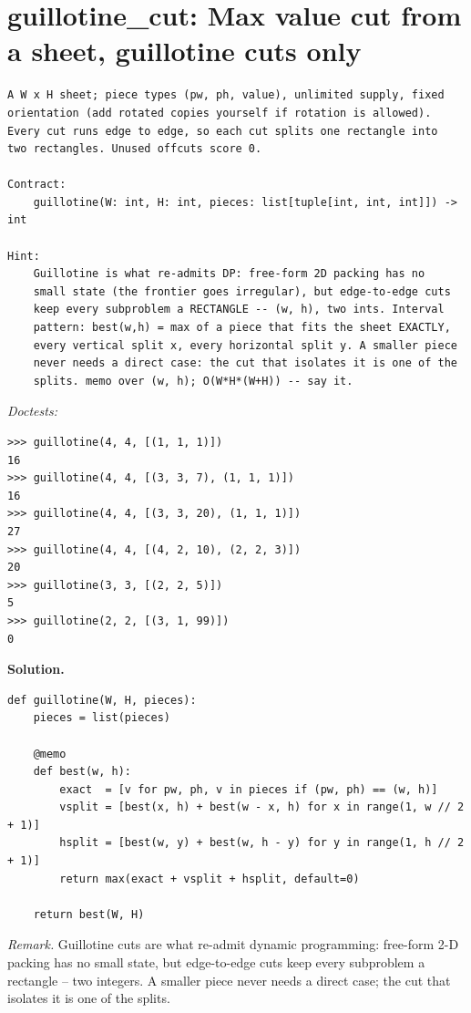 \documentclass[11pt,letterpaper]{book}
\begin{document}
\section{guillotine\_cut: Max value cut from a sheet, guillotine cuts only}
\begin{lstlisting}[style=spec]
A W x H sheet; piece types (pw, ph, value), unlimited supply, fixed
orientation (add rotated copies yourself if rotation is allowed).
Every cut runs edge to edge, so each cut splits one rectangle into
two rectangles. Unused offcuts score 0.

Contract:
    guillotine(W: int, H: int, pieces: list[tuple[int, int, int]]) -> int

Hint:
    Guillotine is what re-admits DP: free-form 2D packing has no
    small state (the frontier goes irregular), but edge-to-edge cuts
    keep every subproblem a RECTANGLE -- (w, h), two ints. Interval
    pattern: best(w,h) = max of a piece that fits the sheet EXACTLY,
    every vertical split x, every horizontal split y. A smaller piece
    never needs a direct case: the cut that isolates it is one of the
    splits. memo over (w, h); O(W*H*(W+H)) -- say it.
\end{lstlisting}
\noindent\textit{Doctests:}
\begin{lstlisting}[style=spec]
>>> guillotine(4, 4, [(1, 1, 1)])
16
>>> guillotine(4, 4, [(3, 3, 7), (1, 1, 1)])
16
>>> guillotine(4, 4, [(3, 3, 20), (1, 1, 1)])
27
>>> guillotine(4, 4, [(4, 2, 10), (2, 2, 3)])
20
>>> guillotine(3, 3, [(2, 2, 5)])
5
>>> guillotine(2, 2, [(3, 1, 99)])
0
\end{lstlisting}
\noindent\textbf{Solution.}
\begin{lstlisting}[style=code]
def guillotine(W, H, pieces):
    pieces = list(pieces)

    @memo
    def best(w, h):
        exact  = [v for pw, ph, v in pieces if (pw, ph) == (w, h)]
        vsplit = [best(x, h) + best(w - x, h) for x in range(1, w // 2 + 1)]
        hsplit = [best(w, y) + best(w, h - y) for y in range(1, h // 2 + 1)]
        return max(exact + vsplit + hsplit, default=0)

    return best(W, H)
\end{lstlisting}

\noindent\textit{Remark.} Guillotine cuts are what re-admit dynamic programming:
free-form 2-D packing has no small state, but edge-to-edge cuts keep every
subproblem a rectangle -- two integers. A smaller piece never needs a direct
case; the cut that isolates it is one of the splits.
\end{document}
